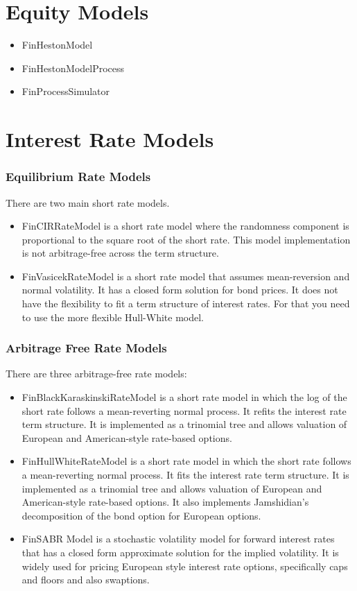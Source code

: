 \documentclass[twoside,11pt]{book}
\begin{document}
\section*{Equity Models}
\begin{itemize}
\item{ FinHestonModel 
}
\item{ FinHestonModelProcess
}
\item{ FinProcessSimulator
}
\end{itemize}


\section*{Interest Rate Models}

\subsubsection*{Equilibrium Rate Models}
There are two main short rate models.
\begin{itemize}
\item{ FinCIRRateModel is a short rate model where the randomness component is proportional to the square root of the short rate. This model implementation is not arbitrage-free across the term structure.
}
\item{ FinVasicekRateModel is a short rate model that assumes mean-reversion and normal volatility. It has a closed form solution for bond prices. It does not have the flexibility to fit a term structure of interest rates. For that you need to use the more flexible Hull-White model.
}
\end{itemize}

\subsubsection*{Arbitrage Free Rate Models}
There are three arbitrage-free rate models:
\begin{itemize}
\item{ FinBlackKaraskinskiRateModel is a short rate model in which the log of the short rate follows a mean-reverting normal process. It refits the interest rate term structure. It is implemented as a trinomial tree and allows valuation of European and American-style rate-based options.
}
\item{ FinHullWhiteRateModel is a short rate model in which the short rate follows a mean-reverting normal process. It fits the interest rate term structure. It is implemented as a trinomial tree and allows valuation of European and American-style rate-based options. It also implements Jamshidian's decomposition of the bond option for European options.
}
\item{ FinSABR Model is a stochastic volatility model for forward interest rates that has a closed form approximate solution for the implied volatility. It is widely used for pricing European style interest rate options, specifically caps and floors and also swaptions.
}
\end{itemize}
\end{document}
